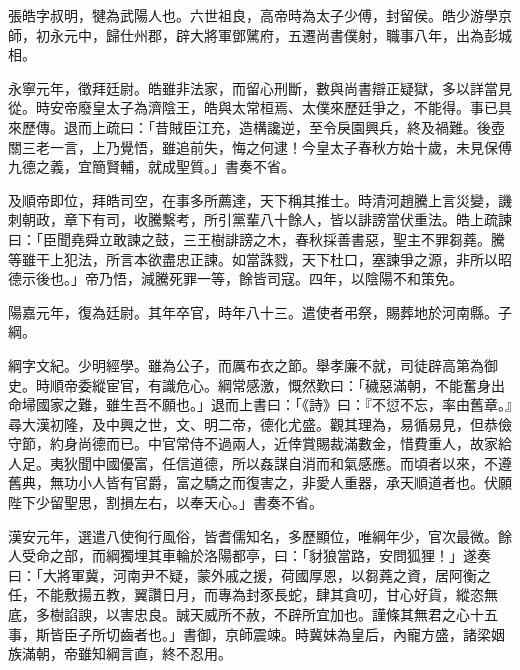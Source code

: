 
\begin{pinyinscope}
張皓字叔明，犍為武陽人也。六世祖良，高帝時為太子少傅，封留侯。皓少游學京師，初永元中，歸仕州郡，辟大將軍鄧騭府，五遷尚書僕射，職事八年，出為彭城相。

永寧元年，徵拜廷尉。皓雖非法家，而留心刑斷，數與尚書辯正疑獄，多以詳當見從。時安帝廢皇太子為濟陰王，皓與太常桓焉、太僕來歷廷爭之，不能得。事已具來歷傳。退而上疏曰：「昔賊臣江充，造構讒逆，至令戾園興兵，終及禍難。後壺關三老一言，上乃覺悟，雖追前失，悔之何逮！今皇太子春秋方始十歲，未見保傅九德之義，宜簡賢輔，就成聖質。」書奏不省。

及順帝即位，拜皓司空，在事多所薦達，天下稱其推士。時清河趙騰上言災變，譏刺朝政，章下有司，收騰繫考，所引黨輩八十餘人，皆以誹謗當伏重法。皓上疏諫曰：「臣聞堯舜立敢諫之鼓，三王樹誹謗之木，春秋採善書惡，聖主不罪芻蕘。騰等雖干上犯法，所言本欲盡忠正諫。如當誅戮，天下杜口，塞諫爭之源，非所以昭德示後也。」帝乃悟，減騰死罪一等，餘皆司寇。四年，以陰陽不和策免。

陽嘉元年，復為廷尉。其年卒官，時年八十三。遣使者弔祭，賜葬地於河南縣。子綱。

綱字文紀。少明經學。雖為公子，而厲布衣之節。舉孝廉不就，司徒辟高第為御史。時順帝委縱宦官，有識危心。綱常感激，慨然歎曰：「穢惡滿朝，不能奮身出命埽國家之難，雖生吾不願也。」退而上書曰：「《詩》曰：『不愆不忘，率由舊章。』尋大漢初隆，及中興之世，文、明二帝，德化尤盛。觀其理為，易循易見，但恭儉守節，約身尚德而已。中官常侍不過兩人，近倖賞賜裁滿數金，惜費重人，故家給人足。夷狄聞中國優富，任信道德，所以姦謀自消而和氣感應。而頃者以來，不遵舊典，無功小人皆有官爵，富之驕之而復害之，非愛人重器，承天順道者也。伏願陛下少留聖思，割損左右，以奉天心。」書奏不省。

漢安元年，選遣八使徇行風俗，皆耆儒知名，多歷顯位，唯綱年少，官次最微。餘人受命之部，而綱獨埋其車輪於洛陽都亭，曰：「豺狼當路，安問狐狸！」遂奏曰：「大將軍冀，河南尹不疑，蒙外戚之援，荷國厚恩，以芻蕘之資，居阿衡之任，不能敷揚五教，翼讚日月，而專為封豕長蛇，肆其貪叨，甘心好貨，縱恣無底，多樹諂諛，以害忠良。誠天威所不赦，不辟所宜加也。謹條其無君之心十五事，斯皆臣子所切齒者也。」書御，京師震竦。時冀妹為皇后，內寵方盛，諸梁姻族滿朝，帝雖知綱言直，終不忍用。


\end{pinyinscope}
